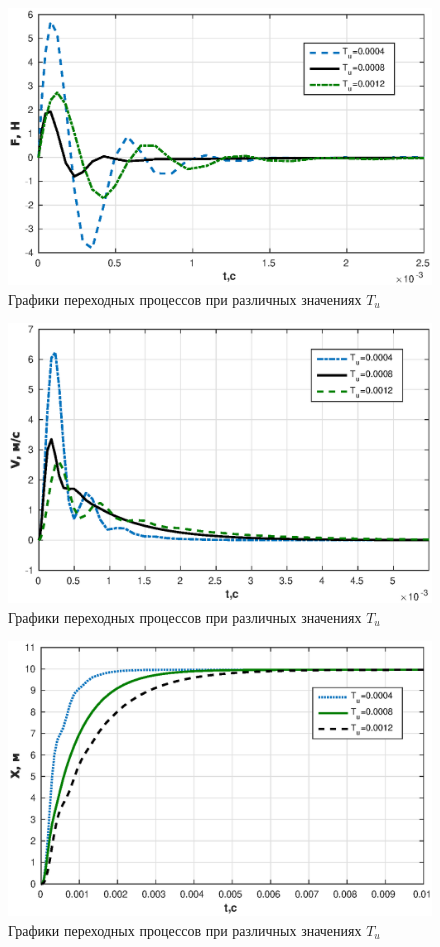 \documentclass[12pt, a4paper]{article}
\begin{document}
\begin{figure}[H]
\centering
\includegraphics[width = \textwidth]{1/F3.eps}
\caption{Графики переходных процессов при различных значениях  $T_{u}$}
\end{figure}

\begin{figure}[H]
\centering
\includegraphics[width = \textwidth]{1/V3.eps}
\caption{Графики переходных процессов при различных значениях  $T_{u}$}
\end{figure}

\begin{figure}[H]
\centering
\includegraphics[width = \textwidth]{1/X3.eps}
\caption{Графики переходных процессов при различных значениях  $T_{u}$}
\end{figure}
 
\end{document}
